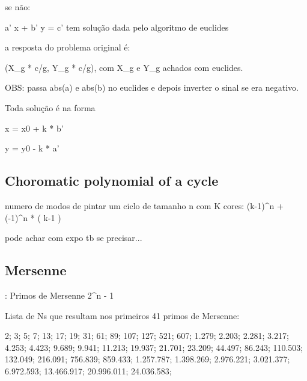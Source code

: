 \documentclass{article}
\begin{document}
se não:

a' x + b' y = c' tem solução dada pelo algoritmo de euclides

a resposta do problema original é:

(X_g * c/g, Y_g * c/g), com X_g e Y_g achados com euclides.

OBS: passa abs(a) e abs(b) no euclides e depois inverter o sinal
se era negativo.

Toda solução é na forma

x = x0 + k * b'

y = y0 - k * a'

\subsection{Choromatic polynomial of a cycle}

numero de modos de pintar um ciclo de tamanho n com K cores: (k-1)^n + (-1)^n * ( k-1 )

pode achar com expo tb se precisar...


\subsection{Mersenne}:
Primos de Mersenne 2^n - 1

Lista de Ns que resultam nos primeiros 41 primos de Mersenne:

2; 3; 5; 7; 13; 17; 19; 31; 61; 89; 107; 127; 521; 607; 1.279; 2.203; 2.281; 3.217; 4.253; 4.423; 9.689; 9.941; 11.213; 19.937; 21.701; 23.209; 44.497; 86.243; 110.503; 132.049; 216.091; 756.839; 859.433; 1.257.787; 1.398.269; 2.976.221; 3.021.377; 6.972.593; 13.466.917; 20.996.011; 24.036.583;
\end{document}
